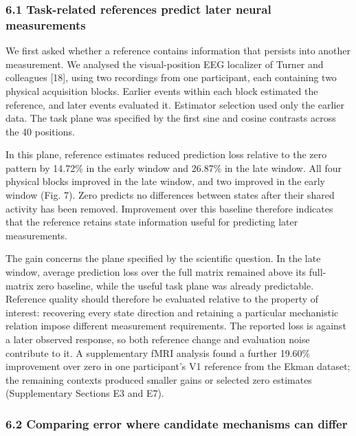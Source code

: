 \documentclass[11pt,a4paper]{article}
\begin{document}
\subsubsection{6.1 Task-related references predict later neural
measurements}\label{task-related-references-predict-later-neural-measurements}

We first asked whether a reference contains information that persists
into another measurement. We analysed the visual-position EEG localizer
of Turner and colleagues {[}18{]}, using two recordings from one
participant, each containing two physical acquisition blocks. Earlier
events within each block estimated the reference, and later events
evaluated it. Estimator selection used only the earlier data. The task
plane was specified by the first sine and cosine contrasts across the 40
positions.

In this plane, reference estimates reduced prediction loss relative to
the zero pattern by 14.72\% in the early window and 26.87\% in the late
window. All four physical blocks improved in the late window, and two
improved in the early window (Fig. 7). Zero predicts no differences
between states after their shared activity has been removed. Improvement
over this baseline therefore indicates that the reference retains state
information useful for predicting later measurements.

The gain concerns the plane specified by the scientific question. In the
late window, average prediction loss over the full matrix remained above
its full-matrix zero baseline, while the useful task plane was already
predictable. Reference quality should therefore be evaluated relative to
the property of interest: recovering every state direction and retaining
a particular mechanistic relation impose different measurement
requirements. The reported loss is against a later observed response, so
both reference change and evaluation noise contribute to it. A
supplementary fMRI analysis found a further 19.60\% improvement over
zero in one participant's V1 reference from the Ekman dataset; the
remaining contexts produced smaller gains or selected zero estimates
(Supplementary Sections E3 and E7).

\subsubsection{6.2 Comparing error where candidate mechanisms can
differ}\label{comparing-error-where-candidate-mechanisms-can-differ}
\end{document}
